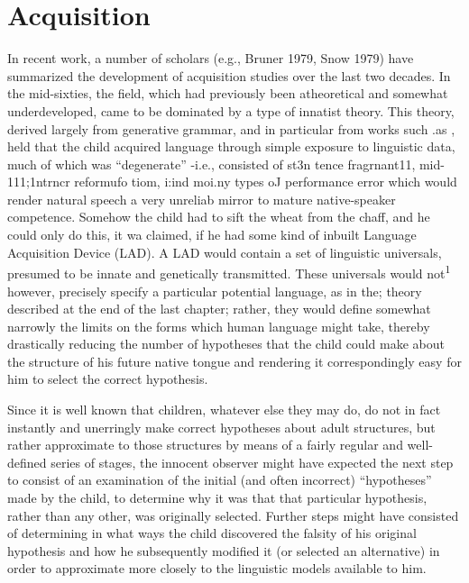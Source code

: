 
\chapter{Acquisition}

In recent work, a number of scholars (e.g., Bruner 1979, Snow 1979) have summarized the development of acquisition studies over the last two decades. In the mid-sixties, the field, which had previously been atheoretical and somewhat underdeveloped, came to be domi\-nated by a type of innatist theory. This theory, derived largely from generative grammar, and in particular from works such .as \citet{Chomsky1962}, held that the child acquired language through simple exposure to linguistic data, much of which was ``degenerate'' {}-i.e., consisted of st3n tence fragrnant11, mid-111;1ntrncr reformufo tiom, i:ind moi.ny types oJ performance error which would render natural speech a very unreliab mirror to mature native-speaker competence. Somehow the child had to sift the wheat from the chaff, and he could only do this, it wa claimed, if he had some kind of inbuilt Language Acquisition Device (LAD). A LAD would contain a set of linguistic universals, presumed to be innate and genetically transmitted. These universals would not\textsuperscript{1} however, precisely specify a particular potential language, as in the; theory described at the end of the last chapter; rather, they would de\-fine somewhat narrowly the limits on the forms which human language might take, thereby drastically reducing the number of hypotheses
that the child could make about the structure of his future native tongue and rendering it correspondingly easy for him to select the correct hypothesis.

Since it is well known that children, whatever else they may do, do not in fact instantly and unerringly make correct hypotheses about adult structures, but rather approximate to those structures by means of a fairly regular and well-defined series of stages, the innocent ob\-server might have expected the next step to consist of an examination of the initial (and often incorrect) ``hypotheses'' made by the child, to determine why it was that that particular hypothesis, rather than any other, was originally selected. Further steps might have con\-sisted of determining in what ways the child discovered the falsity of his original hypothesis and how he subsequently modified it (or selected an alternative) in order to approximate more closely to the linguistic models available to him.

